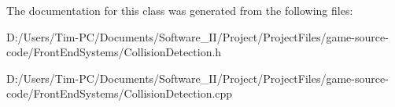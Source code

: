 The documentation for this class was generated from the following files\+:\begin{DoxyCompactItemize}
\item 
D\+:/\+Users/\+Tim-\/\+P\+C/\+Documents/\+Software\+\_\+\+I\+I/\+Project/\+Project\+Files/game-\/source-\/code/\+Front\+End\+Systems/Collision\+Detection.\+h\item 
D\+:/\+Users/\+Tim-\/\+P\+C/\+Documents/\+Software\+\_\+\+I\+I/\+Project/\+Project\+Files/game-\/source-\/code/\+Front\+End\+Systems/Collision\+Detection.\+cpp\end{DoxyCompactItemize}
